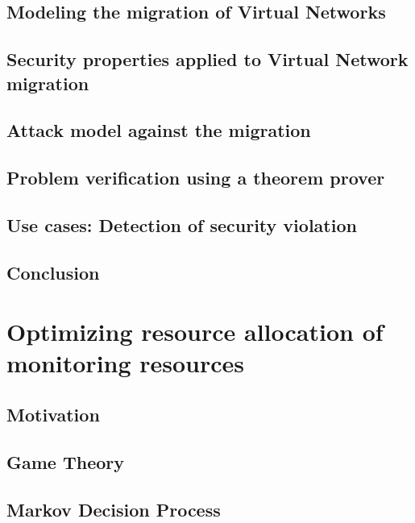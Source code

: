 \documentclass[a4paper, 11pt]{article}
\begin{document}
\subsection{Modeling the migration of Virtual Networks}


\subsection{Security properties applied to Virtual Network migration}


\subsection{Attack model against the migration}


\subsection{Problem verification using a theorem prover}


\subsection{Use cases: Detection of security violation}


\newpage
\subsection{Conclusion}


\newpage
\section{Optimizing resource allocation of monitoring resources}
\label{sec:RAprob}
\subsection{Motivation}




\newpage
\subsection{Game Theory}


\newpage
\subsection{Markov Decision Process}


\newpage

\label{sec:thesis_conclusion}
\newpage
{}


\newpage
\begin{appendices}

\newpage

\end{appendices}
\end{document}
